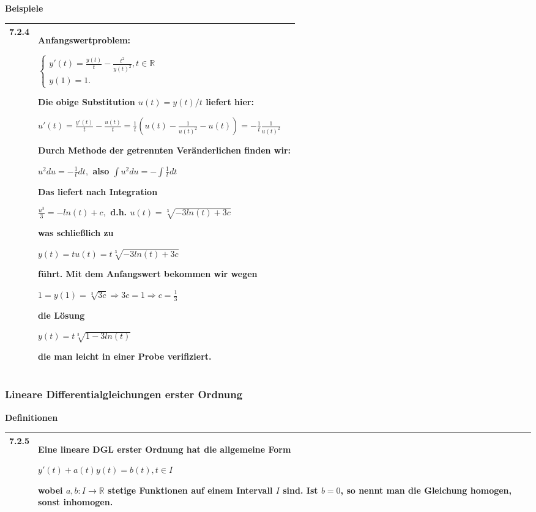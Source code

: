     \noindent
    \textbf{Beispiele}
    \begin{table}[H]
    \begin{tabularx}{\textwidth}{X m{16cm}}
        \toprule

        7.2.4 & Anfangswertproblem: \hfill \break
                \centerline{$   \begin{cases}
                                y'(t) = \frac{y(t)}{t} - \frac{t^2}{y(t)^2}, t \in \mathbb{R} \\
                                y(1) = 1. 
                                \end{cases} $} 
                Die obige Substitution $u(t) = y(t)/t$ liefert hier: \hfill \break
                \centerline{$ u'(t)= \frac{y'(t)}{t} - \frac{u(t)}{t} = \frac{1}{t} (u(t) - \frac{1}{u(t)^2}-u(t)) = - \frac{1}{t} \frac{1}{u(t)^2} $} 
                Durch Methode der getrennten Veränderlichen finden wir: \hfill \break
                \centerline{$ u^2du=-\frac{1}{t}dt,$ also $\int u^2 du= -\int \frac{1}{t}dt$} 
                Das liefert nach Integration \hfill \break
                \centerline{$ \frac{u^3}{3} = -ln(t)+c,$ d.h. $ u(t) = \sqrt[3]{-3ln(t)+3c} $}
                was schließlich zu \hfill \break
                \centerline{$ y(t) = tu(t) = t \sqrt[3]{-3ln(t) +3c} $}
                führt. Mit dem Anfangswert bekommen wir wegen \hfill \break
                \centerline{$ 1 = y(1) = \sqrt[3]{3c} \Rightarrow 3c = 1 \Rightarrow c = \frac{1}{3} $}
                die Lösung \hfill \break
                \centerline{$ y(t) = t \sqrt[3]{1-3ln(t)} $}
                die man leicht in einer Probe verifiziert. \\

        \bottomrule
    \end{tabularx}
    \end{table}
    
\pagebreak

\subsubsection{Lineare Differentialgleichungen erster Ordnung}

    \noindent
    \textbf{Definitionen}
    \begin{table}[H]  
    \begin{tabularx}{\textwidth}{X m{16cm}}
        \toprule

        7.2.5 & Eine lineare DGL erster Ordnung hat die allgemeine Form \hfill \break
                \centerline{$ y'(t) + a(t) y(t) = b(t), t \in I$}
                wobei $a,b: I \rightarrow \mathbb{R}$ stetige Funktionen auf einem Intervall $I$ sind. \hfill \break
                Ist $b= 0$, so nennt man die Gleichung homogen, sonst inhomogen. \\

        \bottomrule

    \end{tabularx}
    \end{table}

